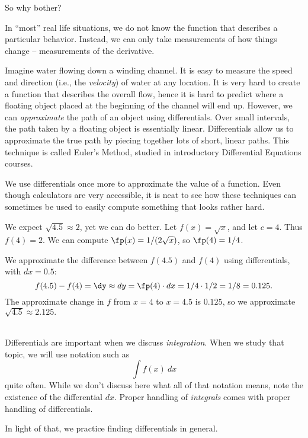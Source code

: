 So why bother?

In ``most'' real life situations, we do not know the function that describes a particular behavior. Instead, we can only take measurements of how things change -- measurements of the derivative.

Imagine water flowing down a winding channel. It is easy to measure the speed and direction (i.e., the \textit{velocity}) of water at any location. It is very hard to create a function that describes the overall flow, hence it is hard to predict where a floating object placed at the beginning of the channel will end up. However, we can \textit{approximate} the path of an object using differentials. Over small intervals, the path taken by a floating object is essentially linear. Differentials allow us to approximate the true path by piecing together lots of short, linear paths. This technique is called Euler's Method, studied in introductory Differential Equations courses.

We use differentials once more to approximate the value of a function. Even though calculators are very accessible, it is neat to see how these techniques can sometimes be used to easily compute something that looks rather hard.\\


{We expect $\sqrt{4.5} \approx 2$, yet we can do better. Let $f(x) = \sqrt{x}$, and let $c=4$. Thus $f(4) = 2$. We can compute $\fp(x) = 1/(2\sqrt{x})$, so $\fp(4) = 1/4$. 

We approximate the difference between $f(4.5)$ and $f(4)$ using differentials, with $dx = 0.5$:
$$f(4.5)-f(4) = \dy \approx dy = \fp(4)\cdot dx = 1/4 \cdot 1/2 = 1/8 = 0.125.$$
The approximate change in $f$ from $x=4$ to $x=4.5$ is $0.125$, so we approximate $\sqrt{4.5} \approx 2.125.$
}\\

Differentials are important when we discuss \textit{integration}. When we study that topic, we will use notation such as $$\int f(x)\ dx$$ quite often. While we don't discuss here what all of that notation means, note the existence of the differential $dx$. Proper handling of \textit{integrals} comes with proper handling of differentials. 

In light of that, we practice finding differentials in general.\\

